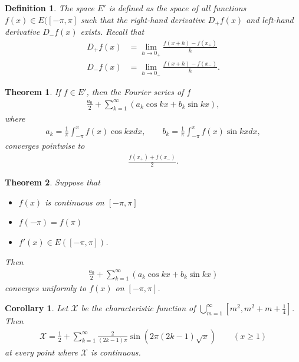 \documentclass[a4paper,10pt]{amsart}
\newtheorem{theorem}{Theorem}[section]
\newtheorem{corollary}{Corollary}[section]
\newtheorem{definition}{Definition}[section]
\newcommand{\X}{\mathcal X}
\begin{document}
\begin{definition}
    The space $E'$ is defined as the space of all functions $f(x) \in 
    E([-\pi, \pi]$
    such that the right-hand derivative $D_{+}f(x)$ and left-hand
    derivative $D_{-}f(x)$ exists. Recall that
    \begin{align*}
        D_{+}f(x) &= \lim_{h \rightarrow 0_{+}}\frac{f(x+h)-f(x_{+})}{h}\\ 
        D_{-}f(x) &= \lim_{h \rightarrow 0_{-}}\frac{f(x+h)-f(x_{-})}{h}.
    \end{align*}
\end{definition}

\begin{theorem}
   If $f \in E'$, then the Fourier series of $f$
   \begin{align*}
      \frac{a_{0}}{2} + \sum_{k = 1}^{\infty}(a_{k}\cos kx + b_{k}\sin kx), 
   \end{align*}
   where
   \begin{align*}
       a_{k} = \frac{1}{\pi}\int^{\pi}_{-\pi}f(x)\cos kx dx, \qquad
       b_{k} = \frac{1}{\pi}\int^{\pi}_{-\pi}f(x)\sin kx dx,
   \end{align*}
   converges pointwise to 
   \begin{align*}
       \frac{f(x_{+}) + f(x_{-})}{2}. 
   \end{align*}
\end{theorem}

\begin{theorem}
   Suppose that 
   \begin{itemize}
       \item $f(x)$ is continuous on $[-\pi, \pi]$
       \item $f(-\pi) = f(\pi)$
       \item $f'(x) \in E([-\pi, \pi])$.
   \end{itemize}
   Then
   \begin{align*}
      \frac{a_{0}}{2} + \sum_{k = 1}^{\infty}(a_{k}\cos kx + b_{k}\sin kx)
   \end{align*}
   converges uniformly to $f(x)$ on $[-\pi, \pi]$. 
\end{theorem}

\begin{corollary}
    Let $\X$ be the characteristic function of 
    $\bigcup_{m=1}^{\infty}[m^2, m^2+m+\frac{1}{4}]$.
    Then
    \begin{align*}
        \X = \frac{1}{2} + \sum_{k=1}^{\infty}
        \frac{2}{(2k-1)\pi}\sin(2\pi(2k-1)\sqrt{x}) 
        \qquad (\mbox{$x \geq 1$}) 
    \end{align*}
    at every point where $\X$ is continuous.
\end{corollary}
\end{document}
